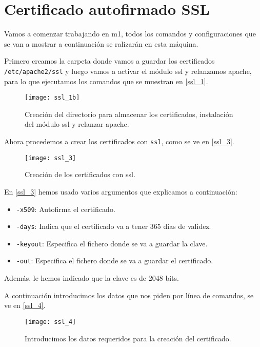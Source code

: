 
\chapter{Certificado autofirmado SSL}

Vamos a comenzar trabajando en m1, todos los comandos y configuraciones que se van a mostrar a continuación se ralizarán en esta máquina.

Primero creamos la carpeta donde vamos a guardar los certificados \verb|/etc/apache2/ssl| y luego vamos a activar el módulo ssl y relanzamos apache, para lo que ejecutamos los comandos que se muestran en \eqref{ssl_1}.

\begin{figure}[h!]
\begin{center}
\caption{Creación del directorio para almacenar los certificados, instalación del módulo ssl y relanzar apache.}
\label{ssl_1}
\texttt{[image: ssl\_1b]}
\end{center}
\end{figure}

Ahora procedemos a crear los certificados con \verb|ssl|, como se ve en \eqref{ssl_3}.

\begin{figure}[h!]
\begin{center}
\caption{Creación de los certificados con ssl.}
\label{ssl_3}
\texttt{[image: ssl\_3]}
\end{center}
\end{figure}

En \eqref{ssl_3} hemos usado varios argumentos que explicamos a continuación:

\begin{itemize}
\item \verb|-x509|: Autofirma el certificado.
\item \verb|-days|: Indica que el certificado va a tener 365 días de validez.
\item \verb|-keyout|: Especifica el fichero donde se va a guardar la clave.
\item \verb|-out|: Especifica el fichero donde se va a guardar el certificado.
\end{itemize}

Además, le hemos indicado que la clave es de 2048 bits.

A continuación introducimos los datos que nos piden por línea de comandos, se ve en \eqref{ssl_4}.

\begin{figure}[h!]
\begin{center}
\caption{Introducimos los datos requeridos para la creación del certificado.}
\label{ssl_4}
\texttt{[image: ssl\_4]}
\end{center}
\end{figure}

